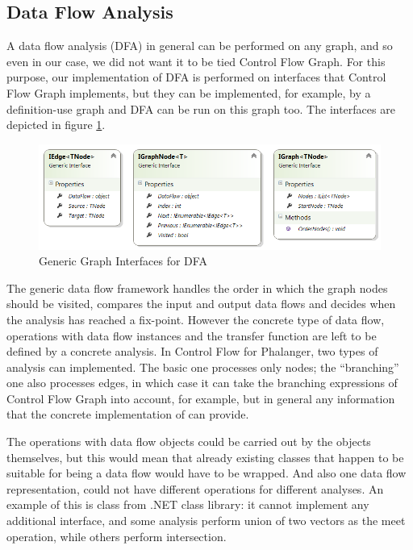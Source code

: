     \subsection{Data Flow Analysis}
        A data flow analysis (DFA) in general can be performed on any graph, 
        and so even in our case, we did not want it to be tied 
        Control Flow Graph. For this purpose, our implementation of DFA is 
        performed on interfaces that Control Flow Graph implements, 
        but they can be implemented, for example, by a definition-use 
        graph\cite{aho1985compilers} and DFA can be run on this graph too.
        The interfaces are depicted in figure \ref{graphifaces}.
        
\begin{figure}[h]  
  \centering
    \includegraphics*[width=\textwidth,height=\textheight,keepaspectratio]{img/graph-ifaces.png}  
    \caption{Generic Graph Interfaces for DFA\label{graphifaces}}
\end{figure}    

        The generic data flow framework handles the order in which the 
        graph nodes should be visited, compares the input and output 
        data flows and decides when the analysis has reached a fix-point. 
        However the concrete type of data flow, operations with data 
        flow instances and the transfer function are left to be defined 
        by a concrete analysis. In Control Flow for 
        Phalanger, two types of analysis can implemented. The basic one 
        processes only nodes; the ``branching'' one also processes edges, 
        in which case it can take the branching expressions of Control 
        Flow Graph into account, for example, but in general any information 
        that the concrete implementation of  can provide.
        
        The operations with data flow objects could be carried out by the 
        objects themselves, but this would mean that already existing 
        classes that happen to be suitable for being a data flow would 
        have to be wrapped. And also one data flow representation, could 
        not have different operations for different analyses. An example 
        of this is  class from .NET class library: it 
        cannot implement any additional interface, and some analysis 
        perform union of two vectors as the meet operation, while 
        others perform intersection.
        
